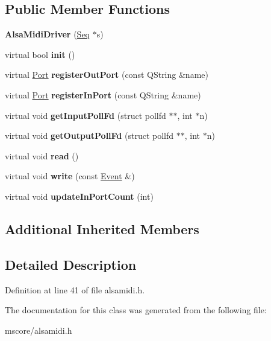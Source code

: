 \subsection*{Public Member Functions}
\begin{DoxyCompactItemize}
\item 
\mbox{\label{class_ms_1_1_alsa_midi_driver_a8155951008b34c727198ab7218ceb833}} 
{\bfseries Alsa\+Midi\+Driver} (\hyperlink{class_ms_1_1_seq}{Seq} $\ast$s)
\item 
\mbox{\label{class_ms_1_1_alsa_midi_driver_a0c84617006cd729fb338dbc9fa2ff231}} 
virtual bool {\bfseries init} ()
\item 
\mbox{\label{class_ms_1_1_alsa_midi_driver_a2aee322130a26cc5a9fcc573085e1f13}} 
virtual \hyperlink{class_ms_1_1_port}{Port} {\bfseries register\+Out\+Port} (const Q\+String \&name)
\item 
\mbox{\label{class_ms_1_1_alsa_midi_driver_af9f48254bbbe0fcbec672a0f04dbf28e}} 
virtual \hyperlink{class_ms_1_1_port}{Port} {\bfseries register\+In\+Port} (const Q\+String \&name)
\item 
\mbox{\label{class_ms_1_1_alsa_midi_driver_aa39fe3cfba79897ee5e88a204b555226}} 
virtual void {\bfseries get\+Input\+Poll\+Fd} (struct pollfd $\ast$$\ast$, int $\ast$n)
\item 
\mbox{\label{class_ms_1_1_alsa_midi_driver_ab8e4f4aab0f8e39d9b1dc40030ae2c8e}} 
virtual void {\bfseries get\+Output\+Poll\+Fd} (struct pollfd $\ast$$\ast$, int $\ast$n)
\item 
\mbox{\label{class_ms_1_1_alsa_midi_driver_a6f0a9fa8c0557f49fb535a3219407245}} 
virtual void {\bfseries read} ()
\item 
\mbox{\label{class_ms_1_1_alsa_midi_driver_a36a64c983e8af8f905207860c980836e}} 
virtual void {\bfseries write} (const \hyperlink{class_ms_1_1_event}{Event} \&)
\item 
\mbox{\label{class_ms_1_1_alsa_midi_driver_af2c5469fa9cc625a2561d4bc25f7db30}} 
virtual void {\bfseries update\+In\+Port\+Count} (int)
\end{DoxyCompactItemize}
\subsection*{Additional Inherited Members}


\subsection{Detailed Description}


Definition at line 41 of file alsamidi.\+h.



The documentation for this class was generated from the following file\+:\begin{DoxyCompactItemize}
\item 
mscore/alsamidi.\+h\end{DoxyCompactItemize}
